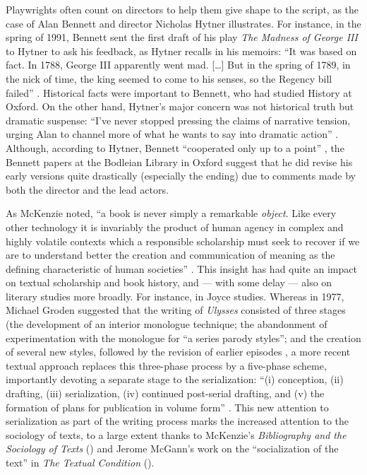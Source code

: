 \begin{paper}
Playwrights often count on directors to help them give shape to the
script, as the case of Alan Bennett and director Nicholas Hytner
illustrates. For instance, in the spring of 1991, Bennett sent the first
draft of his play \emph{The Madness of George III} to Hytner to ask his
feedback, as Hytner recalls in his memoirs: ``It was based on fact. In
1788, George III apparently went mad. {[}\ldots{}{]} But in the spring of
1789, in the nick of time, the king seemed to come to his senses, so the
Regency bill failed'' \citep[117]{hytner_balancing_2018}. Historical facts were
important to Bennett, who had studied History at Oxford. On the other
hand, Hytner's major concern was not historical truth but dramatic
suspense: ``I've never stopped pressing the claims of narrative tension,
urging Alan to channel more of what he wants to say into dramatic
action'' \citep[120]{hytner_balancing_2018}. Although, according to Hytner, Bennett ``cooperated only
up to a point'' \citep[120]{hytner_balancing_2018}, the Bennett papers at the Bodleian
Library in Oxford \citep[588--89]{bennet_play_1989} suggest that he did revise his early
versions quite drastically (especially the ending) due to comments made
by both the director and the lead actors.

As McKenzie noted, ``a book is never simply a remarkable \emph{object}.
Like every other technology it is invariably the product of human agency
in complex and highly volatile contexts which a responsible scholarship
must seek to recover if we are to understand better the creation and
communication of meaning as the defining characteristic of human
societies'' \citep[4]{mckenzie_bibliography_1999}. This insight has had quite an impact on textual
scholarship and book history, and --- with some delay --- also on literary
studies more broadly. For instance, in Joyce studies. Whereas in 1977,
Michael Groden suggested that the writing of \emph{Ulysses} consisted of
three stages (the development of an interior monologue technique; the
abandonment of experimentation with the monologue for ``a series parody
styles''; and the creation of several new styles, followed by the
revision of earlier episodes \citep[4]{groden_ulysses_1977}, a more recent textual
approach replaces this three-phase process by a five-phase scheme,
importantly devoting a separate stage to the serialization: ``(i)
conception, (ii) drafting, (iii) serialization, (iv) continued
post-serial drafting, and (v) the formation of plans for publication in
volume form'' \citep[74]{hutton_serial_2019}. This new attention to serialization as
part of the writing process marks the increased attention to the
sociology of texts, to a large extent thanks to McKenzie's
\emph{Bibliography and the Sociology of Texts} (\citeyear{mckenzie_bibliography_1999}) and Jerome
McGann's work on the ``socialization of the text'' in \emph{The Textual
Condition} (\citeyear{mcgann_textual_1992}).


\end{paper}
